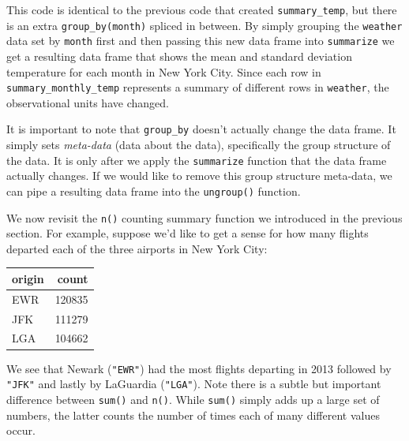 \documentclass[]{tufte-book}
\newenvironment{Shaded}{\begin{snugshade}}{\end{snugshade}}
\newcommand{\KeywordTok}[1]{\textcolor[rgb]{0.13,0.29,0.53}{\textbf{{#1}}}}
\newcommand{\DataTypeTok}[1]{\textcolor[rgb]{0.13,0.29,0.53}{{#1}}}
\newcommand{\StringTok}[1]{\textcolor[rgb]{0.31,0.60,0.02}{{#1}}}
\newcommand{\NormalTok}[1]{{#1}}
\theoremstyle{definition}
\theoremstyle{definition}
\theoremstyle{remark}
\begin{document}
This code is identical to the previous code that created
\texttt{summary\_temp}, but there is an extra \texttt{group\_by(month)}
spliced in between. By simply grouping the \texttt{weather} data set by
\texttt{month} first and then passing this new data frame into
\texttt{summarize} we get a resulting data frame that shows the mean and
standard deviation temperature for each month in New York City. Since
each row in \texttt{summary\_monthly\_temp} represents a summary of
different rows in \texttt{weather}, the observational units have
changed.

It is important to note that \texttt{group\_by} doesn't actually change
the data frame. It simply sets \emph{meta-data} (data about the data),
specifically the group structure of the data. It is only after we apply
the \texttt{summarize} function that the data frame actually changes. If
we would like to remove this group structure meta-data, we can pipe a
resulting data frame into the \texttt{ungroup()} function.

We now revisit the \texttt{n()} counting summary function we introduced
in the previous section. For example, suppose we'd like to get a sense
for how many flights departed each of the three airports in New York
City:

\begin{Shaded}
\end{Shaded}

\begin{tabular}{l|r}
\hline
origin & count\\
\hline
EWR & 120835\\
\hline
JFK & 111279\\
\hline
LGA & 104662\\
\hline
\end{tabular}

We see that Newark (\texttt{"EWR"}) had the most flights departing in
2013 followed by \texttt{"JFK"} and lastly by LaGuardia
(\texttt{"LGA"}). Note there is a subtle but important difference
between \texttt{sum()} and \texttt{n()}. While \texttt{sum()} simply
adds up a large set of numbers, the latter counts the number of times
each of many different values occur.
\end{document}
